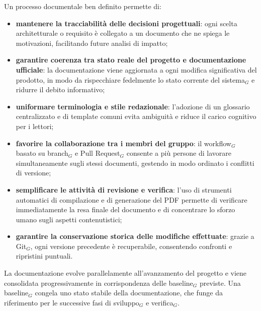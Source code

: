 \documentclass[a4paper, 10pt]{article}
\begin{document}
Un processo documentale ben definito permette di:
\begin{itemize}
    \item \textbf{mantenere la tracciabilità delle decisioni progettuali}: ogni scelta architetturale o requisito è collegato a un documento che ne spiega le motivazioni, facilitando future analisi di impatto;
    \item \textbf{garantire coerenza tra stato reale del progetto e documentazione ufficiale}: la documentazione viene aggiornata a ogni modifica significativa del prodotto, in modo da rispecchiare fedelmente lo stato corrente del sistema$_G$ e ridurre il debito informativo;
    \item \textbf{uniformare terminologia e stile redazionale}: l'adozione di un glossario centralizzato e di template comuni evita ambiguità e riduce il carico cognitivo per i lettori;
    \item \textbf{favorire la collaborazione tra i membri del gruppo}: il workflow$_G$ basato su branch$_G$ e Pull Request$_G$ consente a più persone di lavorare simultaneamente sugli stessi documenti, gestendo in modo ordinato i conflitti di versione;
    \item \textbf{semplificare le attività di revisione e verifica}: l'uso di strumenti automatici di compilazione e di generazione del PDF permette di verificare immediatamente la resa finale del documento e di concentrare lo sforzo umano sugli aspetti contenutistici;
    \item \textbf{garantire la conservazione storica delle modifiche effettuate}: grazie a Git$_G$, ogni versione precedente è recuperabile, consentendo confronti e ripristini puntuali.
\end{itemize}

La documentazione evolve parallelamente all'avanzamento del progetto e viene consolidata progressivamente in corrispondenza delle baseline$_G$ previste. Una baseline$_G$ congela uno stato stabile della documentazione, che funge da riferimento per le successive fasi di sviluppo$_G$ e verifica$_G$.
\end{document}
